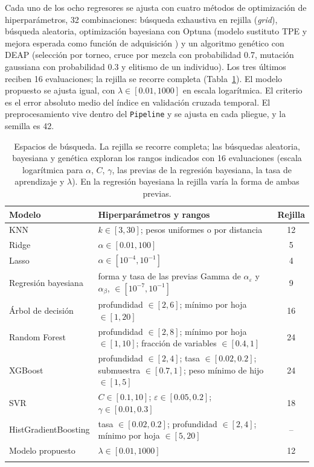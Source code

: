 \documentclass[pdflatex,sn-mathphys-num]{sn-jnl}
\theoremstyle{thmstyleone}
\begin{document}
Cada uno de los ocho regresores se ajusta con cuatro métodos de optimización de hiperparámetros, 32 combinaciones: búsqueda exhaustiva en rejilla (\emph{grid}), búsqueda aleatoria, optimización bayesiana con Optuna \cite{akiba2019} (modelo sustituto TPE y mejora esperada como función de adquisición \cite{bergstra2011}) y un algoritmo genético con DEAP \cite{fortin2012} (selección por torneo, cruce por mezcla con probabilidad 0.7, mutación gaussiana con probabilidad 0.3 y elitismo de un individuo). Los tres últimos reciben 16 evaluaciones; la rejilla se recorre completa (Tabla~\ref{tab:rejillas}). El modelo propuesto se ajusta igual, con $\lambda\in[0.01,1000]$ en escala logarítmica. El criterio es el error absoluto medio del índice en validación cruzada temporal. El preprocesamiento vive dentro del \texttt{Pipeline} y se ajusta en cada pliegue, y la semilla es 42.

\begin{table}[!htb]
\caption{Espacios de búsqueda. La rejilla se recorre completa; las búsquedas aleatoria, bayesiana y genética exploran los rangos indicados con 16 evaluaciones (escala logarítmica para $\alpha$, $C$, $\gamma$, las previas de la regresión bayesiana, la tasa de aprendizaje y $\lambda$). En la regresión bayesiana la rejilla varía la forma de ambas previas.}\label{tab:rejillas}
\footnotesize
\begin{tabular*}{\textwidth}{@{\extracolsep\fill}p{}p{}c}
\toprule
Modelo & Hiperparámetros y rangos & Rejilla \\
\midrule
KNN & $k\in[3,30]$; pesos uniformes o por distancia & 12 \\
Ridge & $\alpha\in[0.01,100]$ & 5 \\
Lasso & $\alpha\in[10^{-4},10^{-1}]$ & 4 \\
Regresión bayesiana & forma y tasa de las previas Gamma de $\alpha_\varepsilon$ y $\alpha_\beta$, $\in[10^{-7},10^{-1}]$ & 9 \\
Árbol de decisión & profundidad $\in[2,6]$; mínimo por hoja $\in[1,20]$ & 16 \\
Random Forest & profundidad $\in[2,8]$; mínimo por hoja $\in[1,10]$; fracción de variables $\in[0.4,1]$ & 24 \\
XGBoost & profundidad $\in[2,4]$; tasa $\in[0.02,0.2]$; submuestra $\in[0.7,1]$; peso mínimo de hijo $\in[1,5]$ & 24 \\
SVR & $C\in[0.1,10]$; $\varepsilon\in[0.05,0.2]$; $\gamma\in[0.01,0.3]$ & 18 \\
HistGradientBoosting & tasa $\in[0.02,0.2]$; profundidad $\in[2,4]$; mínimo por hoja $\in[5,20]$ & -- \\
Modelo propuesto & $\lambda\in[0.01,1000]$ & 12 \\
\botrule
\end{tabular*}
\end{table}
\end{document}
